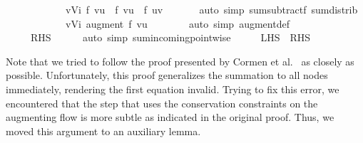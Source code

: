 \begin{isabellebody}
\ \ \isamarkupfalse%
\ \isamarkupfalse%
\ {\isachardoublequoteopen}{\isasymdots}\ \isanewline
\ \ \ \ {\isacharequal}\ {\isacharparenleft}{\isasymSum}v{\isasymin}{\isacharquery}Vi{\isachardot}\ f\ {\isacharparenleft}v{\isacharcomma}u{\isacharparenright}\ {\isacharplus}\ f{\isacharprime}\ {\isacharparenleft}v{\isacharcomma}u{\isacharparenright}\ {\isacharminus}\ f{\isacharprime}\ {\isacharparenleft}u{\isacharcomma}v{\isacharparenright}{\isacharparenright}{\isachardoublequoteclose}\ \isanewline
\ \ \ \ \isamarkupfalse%
\ {\isacharparenleft}auto\ simp{\isacharcolon}\ sum{\isacharunderscore}subtractf\ sum{\isachardot}distrib{\isacharparenright}\isanewline
\ \ \isamarkupfalse%
\ \isamarkupfalse%
\ {\isachardoublequoteopen}{\isasymdots}\ \isanewline
\ \ \ \ {\isacharequal}\ {\isacharparenleft}{\isasymSum}v{\isasymin}{\isacharquery}Vi{\isachardot}\ augment\ f{\isacharprime}\ {\isacharparenleft}v{\isacharcomma}u{\isacharparenright}{\isacharparenright}{\isachardoublequoteclose}\ \ \isanewline
\ \ \ \ \isamarkupfalse%
\ {\isacharparenleft}auto\ simp{\isacharcolon}\ augment{\isacharunderscore}def{\isacharparenright}\isanewline
\ \ \isamarkupfalse%
\ \isamarkupfalse%
\ {\isachardoublequoteopen}{\isasymdots}\ \isanewline
\ \ \ \ {\isacharequal}\ {\isacharquery}RHS{\isachardoublequoteclose}\isanewline
\ \ \ \ \isamarkupfalse%
\ {\isacharparenleft}auto\ simp{\isacharcolon}\ sum{\isacharunderscore}incoming{\isacharunderscore}pointwise{\isacharparenright}\isanewline
\ \ \isamarkupfalse%
\ \isamarkupfalse%
\ {\isachardoublequoteopen}{\isacharquery}LHS\ {\isacharequal}\ {\isacharquery}RHS{\isachardoublequoteclose}\ \isacommand{{\isachardot}}\isamarkupfalse%
\isanewline
{}\isamarkupfalse%
%
\endisatagproof
{\isafoldproof}%
%
\isadelimproof
%
\endisadelimproof
%
\begin{isamarkuptext}%
Note that we tried to follow the proof presented by Cormen et al.~\cite{CLRS09} 
  as closely as possible. Unfortunately, this proof generalizes the summation to all 
  nodes immediately, rendering the first equation invalid.
  Trying to fix this error, we encountered that the step that uses the conservation 
  constraints on the augmenting flow is more subtle as indicated in the original proof.
  Thus, we moved this argument to an auxiliary lemma.%
\end{isamarkuptext}\isamarkuptrue%
\isamarkupfalse%
\ %
\end{isabellebody}
